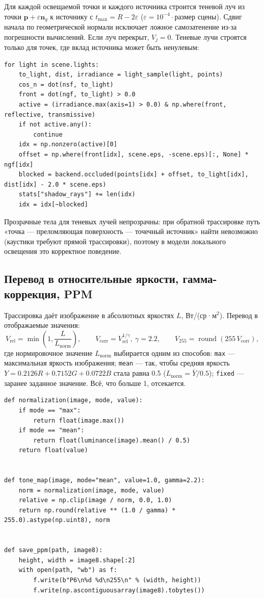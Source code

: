 \documentclass[12pt,a4paper]{article}
\newcommand{\vect}[1]{\mathbf{#1}}
\begin{document}
Для каждой освещаемой точки и каждого источника строится теневой луч из точки $\vect p + \varepsilon\vect n_g$
к источнику с $t_{\max} = R - 2\varepsilon$ ($\varepsilon = 10^{-4}\cdot$размер сцены). Сдвиг начала по
геометрической нормали исключает ложное самозатенение из-за погрешности вычислений. Если луч перекрыт, $V_j=0$.
Теневые лучи строятся только для точек, где вклад источника может быть ненулевым:

\begin{lstlisting}
for light in scene.lights:
    to_light, dist, irradiance = light_sample(light, points)
    cos_n = dot(nsf, to_light)
    front = dot(ngf, to_light) > 0.0
    active = (irradiance.max(axis=1) > 0.0) & np.where(front, reflective, transmissive)
    if not active.any():
        continue
    idx = np.nonzero(active)[0]
    offset = np.where(front[idx], scene.eps, -scene.eps)[:, None] * ngf[idx]
    blocked = backend.occluded(points[idx] + offset, to_light[idx], dist[idx] - 2.0 * scene.eps)
    stats["shadow_rays"] += len(idx)
    idx = idx[~blocked]
\end{lstlisting}

Прозрачные тела для теневых лучей непрозрачны: при обратной трассировке путь «точка — преломляющая поверхность —
точечный источник» найти невозможно (каустики требуют прямой трассировки), поэтому в модели локального освещения
это корректное поведение.

\subsection{Перевод в относительные яркости, гамма-коррекция, PPM}

Трассировка даёт изображение в абсолютных яркостях $L$, Вт/(ср·м$^2$). Перевод в отображаемые значения:
\begin{equation}
V_{\text{rel}} = \min\!\left(1, \frac{L}{L_{\text{norm}}}\right),\qquad V_{\text{corr}} = V_{\text{rel}}^{1/\gamma},\ \gamma = 2.2,
\qquad V_{255} = \operatorname{round}(255\,V_{\text{corr}}),
\end{equation}
где нормировочное значение $L_{\text{norm}}$ выбирается одним из способов: \texttt{max} — максимальная яркость
изображения; \texttt{mean} — так, чтобы средняя яркость $Y = 0.2126R + 0.7152G + 0.0722B$ стала равна 0.5
($L_{\text{norm}} = \bar Y/0.5$); \texttt{fixed} — заранее заданное значение. Всё, что больше 1, отсекается.

\begin{lstlisting}
def normalization(image, mode, value):
    if mode == "max":
        return float(image.max())
    if mode == "mean":
        return float(luminance(image).mean() / 0.5)
    return float(value)


def tone_map(image, mode="mean", value=1.0, gamma=2.2):
    norm = normalization(image, mode, value)
    relative = np.clip(image / norm, 0.0, 1.0)
    return np.round(relative ** (1.0 / gamma) * 255.0).astype(np.uint8), norm


def save_ppm(path, image8):
    height, width = image8.shape[:2]
    with open(path, "wb") as f:
        f.write(b"P6\n%d %d\n255\n" % (width, height))
        f.write(np.ascontiguousarray(image8).tobytes())
\end{lstlisting}
\end{document}
